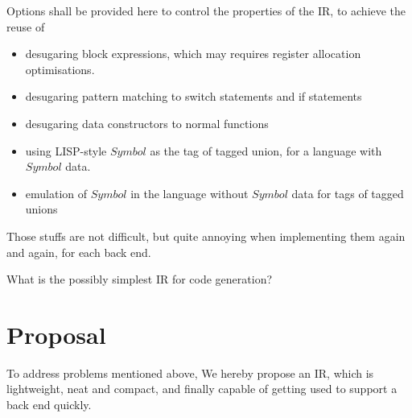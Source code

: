 \documentclass[a1,portrait]{a1poster}
\begin{document}
\begin{multicols}{2}
Options shall be provided here to control the properties of the IR, to achieve the reuse of
\begin{itemize}
    \setlength\itemsep{-0.2em}
    \item desugaring block expressions, which may requires register allocation optimisations.
    \item  desugaring pattern matching to switch statements and if statements
    \item  desugaring data constructors to normal functions
    \item  using LISP-style $Symbol$ as the tag of tagged union, for a language with $Symbol$ data.
    \item  emulation of $Symbol$ in the language without $Symbol$ data for tags of tagged unions
\end{itemize}

Those stuffs are not difficult, but quite annoying when implementing
them again and again, for each back end.

What is the possibly simplest IR for code generation?

\section*{Proposal}

To address problems mentioned above, We hereby propose an IR,
which is lightweight, neat and compact, and finally capable of
getting used to support a back end quickly.

\vspace{-1.5cm}
\begin{multicols}{2}

\begin{minipage}[t]{0.8\linewidth}
\begin{bnf*}
    \\
    \\
    \\
    \\
    \\
    \\
    \\
\end{bnf*}
\end{minipage}


\end{multicols}
\end{multicols}
\end{document}
